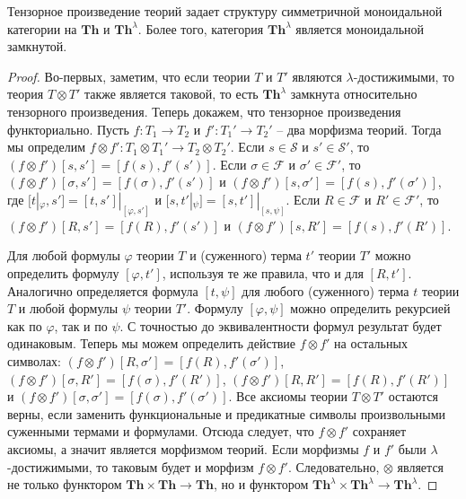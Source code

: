 \documentclass[reqno]{amsart}
\theoremstyle{definition}
\theoremstyle{remark}
\newcommand{\bcat}[1]{\mathbf{#1}}
\newcommand{\Th}{\bcat{Th}}
\begin{document}
\begin{prop}
Тензорное произведение теорий задает структуру симметричной моноидальной категории на $\Th$ и $\Th^\lambda$.
Более того, категория $\Th^\lambda$ является моноидальной замкнутой.
\end{prop}
\begin{proof}
Во-первых, заметим, что если теории $T$ и $T'$ являются $\lambda$-достижимыми, то теория $T \otimes T'$ также является таковой, то есть $\Th^\lambda$ замкнута относительно тензорного произведения.
Теперь докажем, что тензорное произведения функториально.
Пусть $f : T_1 \to T_2$ и $f' : T_1' \to T_2'$ -- два морфизма теорий.
Тогда мы определим $f \otimes f' : T_1 \otimes T_1' \to T_2 \otimes T_2'$.
Если $s \in \mathcal{S}$ и $s' \in \mathcal{S}'$, то $(f \otimes f')[s,s'] = [f(s),f'(s')]$.
Если $\sigma \in \mathcal{F}$ и $\sigma' \in \mathcal{F}'$, то $(f \otimes f')[\sigma,s'] = [f(\sigma),f'(s')]$ и $(f \otimes f')[s,\sigma'] = [f(s),f'(\sigma')]$, где $[t|_\varphi,s'] = [t,s']|_{[\varphi,s']}$ и $[s,t'|_\psi] = [s,t']|_{[s,\psi]}$.
Если $R \in \mathcal{F}$ и $R' \in \mathcal{F}'$, то $(f \otimes f')[R,s'] = [f(R),f'(s')]$ и $(f \otimes f')[s,R'] = [f(s),f'(R')]$.

Для любой формулы $\varphi$ теории $T$ и (суженного) терма $t'$ теории $T'$ можно определить формулу $[\varphi,t']$, используя те же правила, что и для $[R,t']$.
Аналогично определяется формула $[t,\psi]$ для любого (суженного) терма $t$ теории $T$ и любой формулы $\psi$ теории $T'$.
Формулу $[\varphi,\psi]$ можно определить рекурсией как по $\varphi$, так и по $\psi$.
С точностью до эквивалентности формул результат будет одинаковым.
Теперь мы можем определить действие $f \otimes f'$ на остальных символах: $(f \otimes f')[R,\sigma'] = [f(R),f'(\sigma')]$, $(f \otimes f')[\sigma,R'] = [f(\sigma),f'(R')]$, $(f \otimes f')[R,R'] = [f(R),f'(R')]$ и $(f \otimes f')[\sigma,\sigma'] = [f(\sigma),f'(\sigma')]$.
Все аксиомы теории $T \otimes T'$ остаются верны, если заменить функциональные и предикатные символы произвольными суженными термами и формулами.
Отсюда следует, что $f \otimes f'$ сохраняет аксиомы, а значит является морфизмом теорий.
Если морфизмы $f$ и $f'$ были $\lambda$-достижимыми, то таковым будет и морфизм $f \otimes f'$.
Следовательно, $\otimes$ является не только функтором $\Th \times \Th \to \Th$, но и функтором $\Th^\lambda \times \Th^\lambda \to \Th^\lambda$.


\end{proof}
\end{document}
